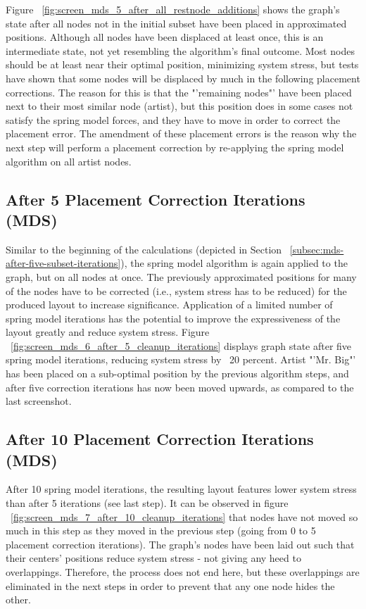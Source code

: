 Figure ~\ref{fig:screen_mds_5_after_all_restnode_additions} shows the graph's state after all nodes not in the initial subset have been placed in approximated positions. Although all nodes have been displaced at least once, this is an intermediate state, not yet resembling the algorithm's final outcome. Most nodes should be at least near their optimal position, minimizing system stress, but tests have shown that some nodes will be displaced by much in the following placement corrections. The reason for this is that the "'remaining nodes"' have been placed next to their most similar node (artist), but this position does in some cases not satisfy the spring model forces, and they have to move in order to correct the placement error. The amendment of these placement errors is the reason why the next step will perform a placement correction by re-applying the spring model algorithm on all artist nodes.

\subsection{After 5 Placement Correction Iterations (MDS)}

Similar to the beginning of the calculations (depicted in Section ~\ref{subsec:mds-after-five-subset-iterations}), the spring model algorithm is again applied to the graph, but on all nodes at once. The previously approximated positions for many of the nodes have to be corrected (i.e., system stress has to be reduced) for the produced layout to increase significance. Application of a limited number of spring model iterations has the potential to improve the expressiveness of the layout greatly and reduce system stress. Figure ~\ref{fig:screen_mds_6_after_5_cleanup_iterations} displays graph state after five spring model iterations, reducing system stress by ~20 percent. Artist "'Mr. Big"' has been placed on a sub-optimal position by the previous algorithm steps, and after five correction iterations has now been moved upwards, as compared to the last screenshot.

\subsection{After 10 Placement Correction Iterations (MDS)}
\label{subsec:mds-after-ten-placement-iterations}

After 10 spring model iterations, the resulting layout features lower system stress than after 5 iterations (see last step). It can be observed in figure ~\ref{fig:screen_mds_7_after_10_cleanup_iterations} that nodes have not moved so much in this step as they moved in the previous step (going from 0 to 5 placement correction iterations).
The graph's nodes have been laid out such that their centers' positions reduce system stress - not giving any heed to overlappings. Therefore, the process does not end here, but these overlappings are eliminated in the next steps in order to prevent that any one node hides the other.

